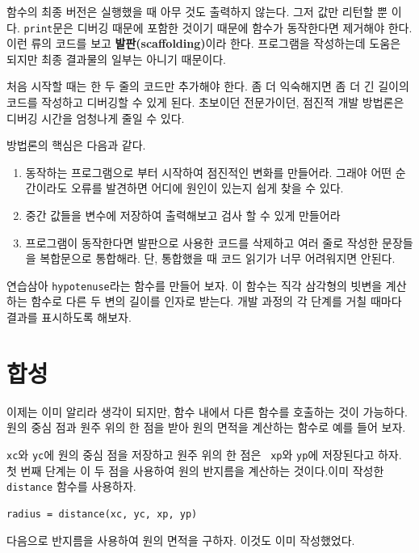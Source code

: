 \documentclass[10pt]{book}
\begin{document}
함수의 최종 버전은 실행했을 때 아무 것도 출력하지 않는다.  그저 값만
리턴할 뿐 이다.  {\tt print}문은 디버깅 때문에 포함한 것이기 때문에
함수가 동작한다면 제거해야 한다.  이런 류의 코드를 보고 {\bf
  발판(scaffolding)}이라 한다.  프로그램을 작성하는데 도움은 되지만
최종 결과물의 일부는 아니기 때문이다.

처음 시작할 때는 한 두 줄의 코드만 추가해야 한다.  좀 더 익숙해지면 좀
더 긴 길이의 코드를 작성하고 디버깅할 수 있게 된다.  초보이던
전문가이던, 점진적 개발 방법론은 디버깅 시간을 엄청나게 줄일 수 있다.

방법론의 핵심은 다음과 같다. 

\begin{enumerate}

\item 동작하는 프로그램으로 부터 시작하여 점진적인 변화를 만들어라.
  그래야 어떤 순간이라도 오류를 발견하면 어디에 원인이 있는지 쉽게 찾을
  수 있다.

\item 중간 값들을 변수에 저장하여 출력해보고 검사 할 수 있게 만들어라

\item 프로그램이 동작한다면 발판으로 사용한 코드를 삭제하고 여러 줄로
  작성한 문장들을 복합문으로 통합해라.  단, 통합했을 때 코드 읽기가
  너무 어려워지면 안된다.

\end{enumerate}

연습삼아 {\tt hypotenuse}라는 함수를 만들어 보자.  이 함수는 직각
삼각형의 빗변을 계산하는 함수로 다른 두 변의 길이를 인자로 받는다.
개발 과정의 각 단계를 거칠 때마다 결과를 표시하도록 해보자.



\section{합성}

이제는 이미 알리라 생각이 되지만, 함수 내에서 다른 함수를 호출하는 것이
가능하다.  원의 중심 점과 원주 위의 한 점을 받아 원의 면적을 계산하는
함수로 예를 들어 보자.

{\tt xc}와 {\tt yc}에 원의 중심 점을 저장하고 원주 위의 한 점은 {\tt
  xp}와 {\tt yp}에 저장된다고 하자.  첫 번째 단계는 이 두 점을 사용하여
원의 반지름을 계산하는 것이다.이미 작성한 {\tt distance} 함수를
사용하자.


\begin{verbatim}
radius = distance(xc, yc, xp, yp)
\end{verbatim}
%
다음으로 반지름을 사용하여 원의 면적을 구하자.  이것도 이미 작성했었다.
\end{document}
